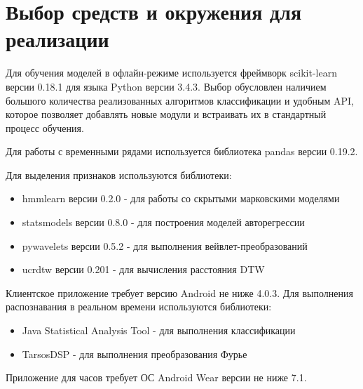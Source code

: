 
\section{Выбор средств и окружения для реализации}

Для обучения моделей в офлайн-режиме используется фреймворк scikit-learn версии 0.18.1 для языка Python версии 3.4.3. Выбор обусловлен наличием большого количества реализованных алгоритмов классификации и удобным API, которое позволяет добавлять новые модули и встраивать их в стандартный процесс обучения. 

Для работы с временными рядами используется библиотека pandas версии 0.19.2.

Для выделения признаков используются библиотеки:

\begin{itemize}
\item hmmlearn версии 0.2.0 - для работы со скрытыми марковскими моделями
\item statsmodels версии 0.8.0 - для построения моделей авторегрессии
\item pywavelets версии 0.5.2 - для выполнения вейвлет-преобразований
\item ucrdtw версии 0.201 - для вычисления расстояния DTW
\end{itemize}

Клиентское приложение требует версию Android не ниже 4.0.3.  Для выполнения распознавания в реальном времени используются библиотеки:

\begin{itemize}
\item Java Statistical Analysis Tool - для выполнения классификации
\item TarsosDSP - для выполнения преобразования Фурье
\end{itemize}

Приложение для часов требует ОС Android Wear версии не ниже 7.1.


